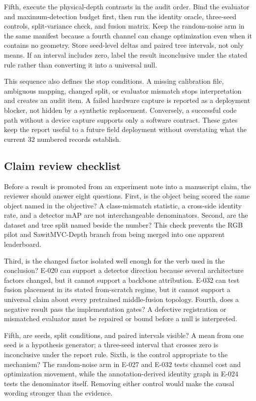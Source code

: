 \documentclass[preprint,12pt]{elsarticle}
\begin{document}
Fifth, execute the physical-depth contrasts in the audit order. Bind the
evaluator and maximum-detection budget first, then run the identity oracle,
three-seed controls, split-variance check, and fusion matrix. Keep the
random-noise arm in the same manifest because a fourth channel can change
optimization even when it contains no geometry. Store seed-level deltas and
paired tree intervals, not only means. If an interval includes zero, label
the result inconclusive under the stated rule rather than converting it into
a universal null.

This sequence also defines the stop conditions. A missing calibration file,
ambiguous mapping, changed split, or evaluator mismatch stops interpretation
and creates an audit item. A failed hardware capture is reported as a
deployment blocker, not hidden by a synthetic replacement. Conversely, a
successful code path without a device capture supports only a software
contract. These gates keep the report useful to a future field deployment
without overstating what the current 32 numbered records establish.

\subsection{Claim review checklist}
Before a result is promoted from an experiment note into a manuscript claim,
the reviewer should answer eight questions. First, is the object being scored
the same object named in the objective? A class-mismatch statistic, a
cross-side identity rate, and a detector mAP are not interchangeable
denominators. Second, are the dataset and tree split named beside the number?
This check prevents the RGB pilot and SawitMVC-Depth branch from being merged
into one apparent leaderboard.

Third, is the changed factor isolated well enough for the verb used in the
conclusion? E-020 can support a detector direction because several architecture
factors changed, but it cannot support a backbone attribution. E-032 can test
fusion placement in its stated from-scratch regime, but it cannot support a
universal claim about every pretrained middle-fusion topology. Fourth, does a
negative result pass the implementation gates? A defective registration or
mismatched evaluator must be repaired or bound before a null is interpreted.

Fifth, are seeds, split conditions, and paired intervals visible? A mean from
one seed is a hypothesis generator; a three-seed interval that crosses zero is
inconclusive under the report rule. Sixth, is the control appropriate to the
mechanism? The random-noise arm in E-027 and E-032 tests channel cost and
optimization movement, while the annotation-derived identity graph in E-024 tests the
denominator itself. Removing either control would make the causal wording
stronger than the evidence.
\end{document}
